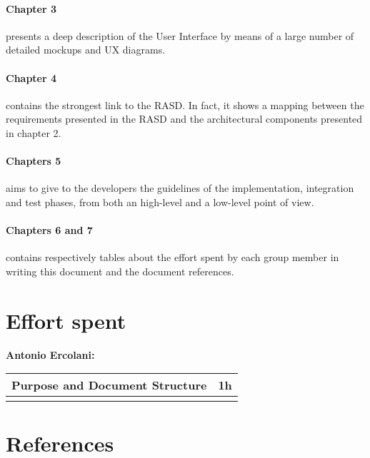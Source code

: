 \documentclass[]{article}
\begin{document}
			\paragraph{Chapter 3} presents a deep description of the User Interface by means of a large number of detailed mockups and UX diagrams.
			
			\paragraph{Chapter 4} contains the strongest link to the RASD. In fact, it shows a mapping between the requirements presented in the RASD and the architectural components presented in chapter 2.
			
			\paragraph{Chapters 5} aims to give to the developers the guidelines of the implementation, integration and test phases, from both an high-level and a low-level point of view.
		
			\paragraph{Chapters 6 and 7} contains respectively tables about the effort spent by each group member in writing this document and the document references.
		
			
			
		\section{Effort spent}
			
			\medskip
			\textbf{\large Antonio Ercolani:} \\ \newline
			\begin{tabular}{|l|c|}
				\hline
				Purpose and Document Structure &  \textbf{1h} \\ \hline
				\rowcolor[HTML]{DCDCDC} 
				 & \textbf{} \\ \hline
				
			\end{tabular}
	
			
			\section{References}	
			
			
	

				
\end{document}

